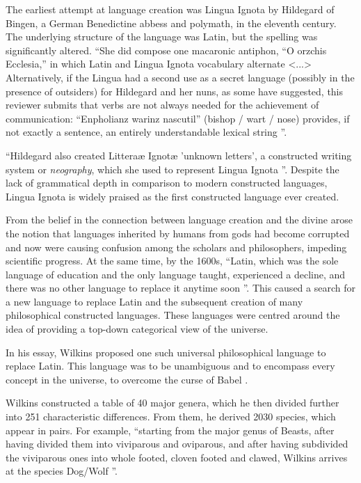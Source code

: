 \documentclass[14pt, a4paper]{extreport}
\begin{document}
The earliest attempt at language creation was Lingua Ignota by Hildegard of Bingen, a German Benedictine abbess and polymath, in the eleventh century. The underlying structure of the language was Latin, but the spelling was significantly altered. ``She did compose one macaronic antiphon, ``O orzchis Ecclesia,'' in which Latin and Lingua Ignota vocabulary alternate <...> Alternatively, if the Lingua had a second use as a secret language (possibly in the presence of outsiders) for Hildegard and her nuns, as some have suggested, this reviewer submits that verbs are not always needed for the achievement of communication: ``Enpholianz warinz nascutil'' (bishop / wart / nose) provides, if not exactly a sentence, an entirely understandable lexical string \parencite{higley}''.

``Hildegard also created Litteraæ Ignotæ 'unknown letters', a constructed writing system or \textit{neography}, which she used to represent Lingua Ignota \parencite{sanders}''. Despite the lack of grammatical depth in comparison to modern constructed languages, Lingua Ignota is widely praised as the first constructed language ever created.

From the belief in the connection between language creation and the divine arose the notion that languages inherited by humans from gods had become corrupted and now were causing confusion among the scholars and philosophers, impeding scientific progress. At the same time, by the 1600s, ``Latin, which was the sole language of education and the only language taught, experienced a decline, and there was no other language to replace it anytime soon \parencite[51]{stria}''. This caused a search for a new language to replace Latin and the subsequent creation of many philosophical constructed languages. These languages were centred around the idea of providing a top-down categorical view of the universe.

In his essay, Wilkins proposed one such universal philosophical language to replace Latin. This language was to be unambiguous and to encompass every concept in the universe, to overcome the curse of Babel \parencite[ch. 2, p. 1]{wilkins}.

Wilkins constructed a table of 40 major genera, which he then divided further into 251 characteristic differences. From them, he derived 2030 species, which appear in pairs. For example, ``starting from the major genus of Beasts, after having divided them into viviparous and oviparous, and after having subdivided the viviparous ones into whole footed, cloven footed and clawed, Wilkins arrives at the species Dog/Wolf \parencite[239]{eco}''.
\end{document}
